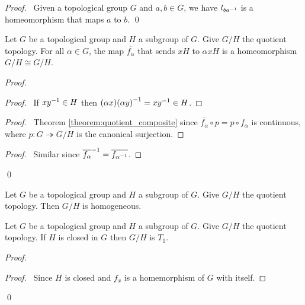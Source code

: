 \begin{proof}
    \pf\ Given a topological group $G$ and $a, b \in G$, we have $l_{b{a}^{-1}}$
    is a homeomorphism that maps $a$ to $b$. \qed
\end{proof}

\begin{proposition}
    Let $G$ be a topological group and $H$ a subgroup of $G$. Give $G / H$
    the quotient topology. For all $\alpha \in G$, the map $\overline{f_\alpha}$ that
    sends $xH$ to $\alpha xH$ is a homeomorphism $G / H \cong G / H$.    
\end{proposition}

\begin{proof}
    \pf
    \begin{proof}
        \pf\ If $x{y}^{-1} \in H$ then $(\alpha x) {(\alpha y)}^{-1} = x {y}^{-1}
        \in H$.
    \end{proof}
    \begin{proof}
        \pf\ Theorem \ref{theorem:quotient_composite} since $\overline{f_\alpha} \circ p
        = p \circ f_\alpha$ is continuous, where $p : G \twoheadrightarrow G / H$
        is the canonical surjection.
    \end{proof}
    \begin{proof}
        \pf\ Similar since ${\overline{f_\alpha}}^{-1} = \overline{f_{{\alpha}^{-1}}}$.
    \end{proof}
    \qed
\end{proof}

\begin{corollary}
    Let $G$ be a topological group and $H$ a subgroup of $G$. Give $G / H$
    the quotient topology. Then $G / H$ is homogeneous.
\end{corollary}

\begin{proposition}
    \label{proposition:T1_quotient}
    Let $G$ be a topological group and $H$ a subgroup of $G$. Give $G / H$
    the quotient topology. If $H$ is closed in $G$ then $G / H$ is $T_1$.
\end{proposition}

\begin{proof}
    \pf
    \begin{proof}
        \pf\ Since $H$ is closed and $f_x$ is a homemorphism of $G$ with
        itself.
    \end{proof}
    \qed
\end{proof}

